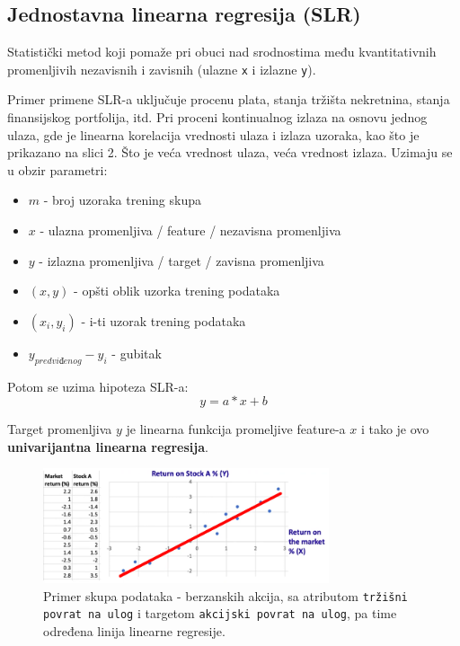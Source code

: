 \documentclass[fontsize=12bp, paper=a4]{scrarticle}
\begin{document}
\subsection{Jednostavna linearna regresija (SLR)}
Statistički metod koji pomaže pri obuci nad srodnostima među kvantitativnih promenljivih nezavisnih i zavisnih (ulazne \texttt{x} i izlazne \texttt{y}).

Primer primene SLR-a uključuje procenu plata, stanja tržišta nekretnina, stanja finansijskog portfolija, itd.
Pri proceni kontinualnog izlaza na osnovu jednog ulaza, gde je linearna korelacija vrednosti ulaza i izlaza uzoraka, kao što je prikazano na slici 2. Što je veća vrednost ulaza, veća vrednost izlaza. Uzimaju se u obzir parametri:
\begin{itemize}
    \item $m$ - broj uzoraka trening skupa
    \item $x$ - ulazna promenljiva / feature / nezavisna promenljiva
    \item $y$ - izlazna promenljiva / target / zavisna promenljiva
    \item $(x,y)$ - opšti oblik uzorka trening podataka
    \item $(x_i, y_i)$ - i-ti uzorak trening podataka
    \item $y_{predviđenog} - y_i$ - gubitak
\end{itemize}

Potom se uzima hipoteza SLR-a:
$$y= a*x + b$$

Target promenljiva $y$ je linearna funkcija promeljive feature-a $x$ i tako je ovo \textbf{univarijantna linearna regresija}.

\begin{figure}[h!]
    \centering
    \includegraphics[width=0.75\textwidth]{2.png}
    \caption{\centering Primer skupa podataka - berzanskih akcija, sa atributom \texttt{tržišni povrat na ulog} i targetom \texttt {akcijski povrat na ulog}, pa time određena linija linearne regresije.}
\end{figure}
\end{document}
